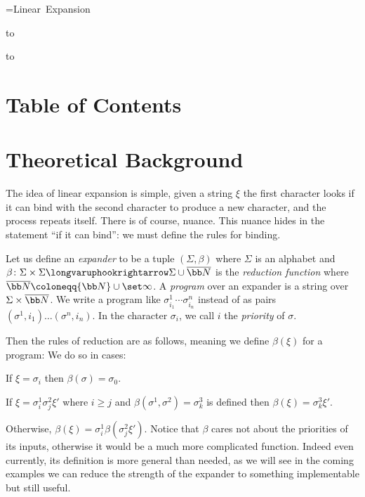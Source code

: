 




{=\hbox{Linear Expansion}
\centerline{
    \vbox{
        \smallskip
        \hbox to
    }
}}

\bigskip
\hbox to

\section*{Table of Contents}

\tableofcontents

\vfill\break

\section{Theoretical Background}

The idea of linear expansion is simple, given a string $\xi$ the first character looks if it can bind with the second character to produce a new character, and the process repeats itself.
There is of course, nuance.
This nuance hides in the statement ``if it can bind'': we must define the rules for binding.

Let us define an {\it expander} to be a tuple $(\Sigma,\beta)$ where $\Sigma$ is an alphabet  and $\beta\colon\Sigma\times\Sigma\longvaruphookrightarrow\Sigma\cup\overline{\bb N}$ is the
{\it reduction function} where $\overline{\bb N}\coloneqq{\bb N}\cup\set\infty$.
A {\it program} over an expander is a string over $\Sigma\times\overline{\bb N}$.
We write a program like $\sigma^1_{i_1}\cdots\sigma^n_{i_n}$ instead of as pairs $(\sigma^1,i_1)\dots(\sigma^n,i_n)$.
In the character $\sigma_i$, we call $i$ the {\it priority} of $\sigma$.

Then the rules of reduction are as follows, meaning we define $\beta(\xi)$ for a program:
We do so in cases:
\benum
    \item If $\xi=\sigma_i$ then $\beta(\sigma)=\sigma_0$.
    \item If $\xi=\sigma^1_i\sigma^2_j\xi'$ where $i\geq j$ and $\beta(\sigma^1,\sigma^2)=\sigma^3_k$ is defined then $\beta(\xi)=\sigma^3_k\xi'$.
    \item Otherwise, $\beta(\xi)=\sigma^1_i\beta(\sigma^2_j\xi')$.
\eenum
Notice that $\beta$ cares not about the priorities of its inputs, otherwise it would be a much more complicated function.
Indeed even currently, its definition is more general than needed, as we will see in the coming examples we can reduce the strength of the expander to something implementable but still useful.

